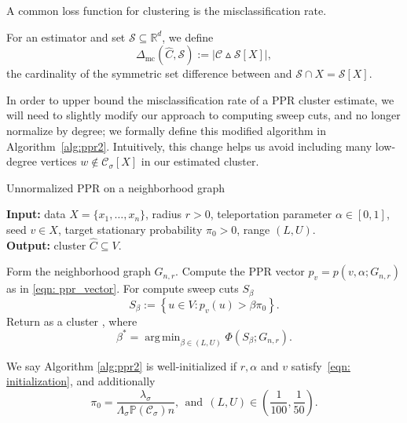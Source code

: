 \documentclass[11pt,twoside]{article}
\newcommand{\set}[1]{\left\{#1\right\}}
\newcommand{\abs}[1]{\left \lvert #1 \right \rvert}
\newcommand{\Reals}{\mathbb{R}}
\newcommand{\1}{\mathbbm{1}}
\newcommand{\pbf}{p}        %
\newcommand{\Xbf}{X}
\newcommand{\Pbb}{\mathbb{P}}
\newcommand{\Cset}{\mathcal{C}}
\newcommand{\Csig}{\Cset_{\sigma}}
\newcommand{\Cest}{\widehat{C}}
\DeclareMathOperator*{\argmin}{arg\,min}
\begin{document}
A common loss function for clustering is the misclassification rate.
\begin{definition}
	\label{def: symmetric_set_diff}
	For an estimator \smash{$\Cest \subseteq \Xbf$} and set
	$\mathcal{S} \subseteq \Reals^d$, we define   
	\begin{equation}
	\label{eqn: misclassification_rate}
	\Delta_{\textrm{mc}}(\Cest, \mathcal{S}) := \abs{\Cset \vartriangle \mathcal{S}[\Xbf]},
	\end{equation}
	the cardinality of the symmetric set difference between 
	\smash{$\Cest$} and $\mathcal{S} \cap \Xbf = \mathcal{S}[\Xbf]$. 
\end{definition}

In order to upper bound the misclassification rate of a PPR cluster estimate, we will need to slightly modify our approach to computing sweep cuts, and no longer normalize by degree; we formally define this modified algorithm in Algorithm~\ref{alg:ppr2}. Intuitively, this change helps us avoid including many low-degree vertices $w \not\in \Csig[\Xbf]$ in our estimated cluster.
\begin{algorithm}
	\caption{Unnormalized PPR on a neighborhood graph}
	\label{alg:ppr2}	
	{\bfseries Input:} data $\Xbf=\{x_1,\ldots,x_n\}$, radius $r > 0$, teleportation
	parameter $\alpha \in [0,1]$, seed $v \in \Xbf$, target stationary probability
	$\pi_0 > 0$, range $(L,U)$. \\     
	{\bfseries Output:} cluster $\Cest \subseteq V$.
	\begin{algorithmic}[1]
		\STATE Form the neighborhood graph $G_{n,r}$.
		\STATE Compute the PPR vector $p_v=\pbf(v, \alpha; G_{n,r})$ as in \eqref{eqn: 
			ppr_vector}. 
		\STATE For  compute sweep cuts 
		$S_{\beta}$
		\begin{equation}
		\label{eqn:sweep_cuts2}
		S_\beta := \set{u \in V: p_v(u) > \beta \pi_0}.
		\end{equation}
		\STATE Return as a cluster \smash{$\Cest_{\textrm{un}} = S_{\beta^*}$}, where  
		$$
		\beta^* = \argmin_{\beta \in (L,U)} \Phi(S_{\beta}; G_{n,r}).
		$$
	\end{algorithmic}
\end{algorithm}

We say Algorithm \ref{alg:ppr2} is well-initialized if $r,\alpha$ and $v$ satisfy~\eqref{eqn: initialization}, and additionally
\begin{equation}
\label{eqn:initialization_2}
\pi_0 = \frac{\lambda_{\sigma}}{\Lambda_{\sigma}\Pbb(\Csig)n}, ~~\textrm{and}~~ (L,U) \in \left(\frac{1}{100},\frac{1}{50}\right).
\end{equation}
\end{document}
